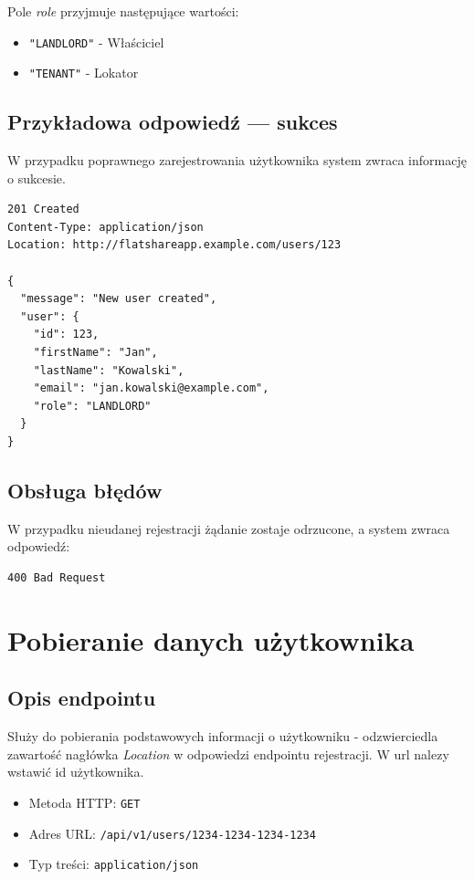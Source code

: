 \documentclass[11pt, a4paper]{article}
\begin{document}
Pole \textit{role} przyjmuje następujące wartości:
\begin{itemize}
  \item \texttt{"LANDLORD"} - Właściciel
  \item \texttt{"TENANT"} - Lokator
\end{itemize}

\subsection{Przykładowa odpowiedź — sukces}

W przypadku poprawnego zarejestrowania użytkownika system zwraca informację o sukcesie. 

\begin{lstlisting}[style=http,caption={Odpowiedź HTTP — sukces}]
201 Created
Content-Type: application/json
Location: http://flatshareapp.example.com/users/123

{
  "message": "New user created",
  "user": {
    "id": 123,
    "firstName": "Jan",
    "lastName": "Kowalski",
    "email": "jan.kowalski@example.com",
    "role": "LANDLORD"
  }
}
\end{lstlisting}

\subsection{Obsługa błędów}

W przypadku nieudanej rejestracji żądanie zostaje odrzucone, a system zwraca odpowiedź:

\begin{lstlisting}[style=http,caption={Odpowiedź HTTP — nieudana rejestracja}]
400 Bad Request
\end{lstlisting}

\section{Pobieranie danych użytkownika}

\subsection{Opis endpointu}

Służy do pobierania podstawowych informacji o użytkowniku - odzwierciedla zawartość nagłówka \textit{Location} w odpowiedzi endpointu rejestracji. W url nalezy wstawić id użytkownika.

\begin{itemize}
    \item Metoda HTTP: \texttt{GET}
    \item Adres URL: \texttt{/api/v1/users/1234-1234-1234-1234}
    \item Typ treści: \texttt{application/json}
\end{itemize}
\end{document}
